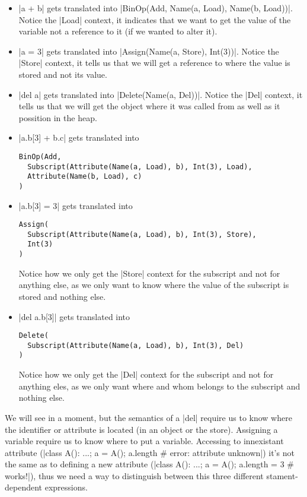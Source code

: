 \begin{itemize}
\item
  \pycode|a + b| gets translated into
  \pycode|BinOp(Add, Name(a, Load), Name(b, Load))|. Notice the
  \pycode|Load| context, it indicates that we want to get the value of
  the variable not a reference to it (if we wanted to alter it).
\item
  \pycode|a = 3| gets translated into
  \pycode|Assign(Name(a, Store), Int(3))|. Notice the \pycode|Store|
  context, it tells us that we will get a reference to where the value
  is stored and not its value.
\item
  \pycode|del a| gets translated into \pycode|Delete(Name(a, Del))|.
  Notice the \pycode|Del| context, it tells us that we will get the
  object where it was called from as well as it possition in the heap.
\item
  \pycode|a.b[3] + b.c| gets translated into

\begin{verbatim}
BinOp(Add,
  Subscript(Attribute(Name(a, Load), b), Int(3), Load),
  Attribute(Name(b, Load), c)
)
\end{verbatim}
\item
  \pycode|a.b[3] = 3| gets translated into

\begin{verbatim}
Assign(
  Subscript(Attribute(Name(a, Load), b), Int(3), Store),
  Int(3)
)
\end{verbatim}

  Notice how we only get the \pycode|Store| context for the subscript
  and not for anything else, as we only want to know where the value of
  the subscript is stored and nothing else.
\item
  \pycode|del a.b[3]| gets translated into

\begin{verbatim}
Delete(
  Subscript(Attribute(Name(a, Load), b), Int(3), Del)
)
\end{verbatim}

  Notice how we only get the \pycode|Del| context for the subscript and
  not for anything eles, as we only want where and whom belongs to the
  subscript and nothing else.
\end{itemize}

We will see in a moment, but the semantics of a \pycode|del| require us
to know where the identifier or attribute is located (in an object or
the store). Assigning a variable require us to know where to put a
variable. Accessing to innexistant attribute
(\pycode|class A(): ...; a = A(); a.length # error: attribute unknown|)
it's not the same as to defining a new attribute
(\pycode|class A(): ...; a = A(); a.length = 3 # works!|),
thus we need a way to distinguish between this three different
stament-dependent expressions.


